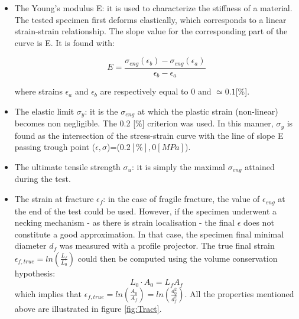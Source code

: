 \begin{itemize}

\item The Young's modulus E: it is used to characterize the stiffness of a material. The tested specimen first deforms elastically, which corresponds to a linear strain-strain relationship. The slope value for the corresponding part of the curve is  E. It is found with:

$$E=\frac{\sigma_{eng}(\epsilon_b)-\sigma_{eng}(\epsilon_a)}{\epsilon_b-\epsilon_a}$$

where strains $\epsilon_a$ and $\epsilon_b$ are respectively equal to 0 and $\simeq 0.1$[\%].

\item The elastic limit $\sigma_y$: it is the $\sigma_{eng}$ at which the plastic strain (non-linear) becomes non negligible. The 0.2 [\%] criterion was used. In this manner, $\sigma_y$ is found as the intersection of the stress-strain curve with the line of slope E passing trough point ($\epsilon,\sigma$)=($0.2 [\%],0 [MPa]$).

\item The ultimate tensile strength $\sigma_u$: it is simply the maximal $\sigma_{eng}$ attained during the test.

\item The strain at fracture $\epsilon_{f}$: in the case of fragile fracture, the value of $\epsilon_{eng}$ at the end of the test could be used. However, if the specimen underwent a necking mechanism -  as there is strain localisation - the final $\epsilon$ does not constitute a good approximation. In that case, the specimen final minimal diameter $d_f$ was measured with a profile projector. The true final strain $\epsilon_{f,true}=ln(\frac{L_f}{L_0})$ could then be computed using the volume conservation hypothesis: $$L_0 \cdot A_0 = L_f A_f $$
which implies that $\epsilon_{f,true}=ln(\frac{A_0}{A_f})=ln(\frac{d_0^2}{d_f^2})$. All the properties mentioned above are illustrated in figure \ref{fig:Tract}.


\end{itemize}

